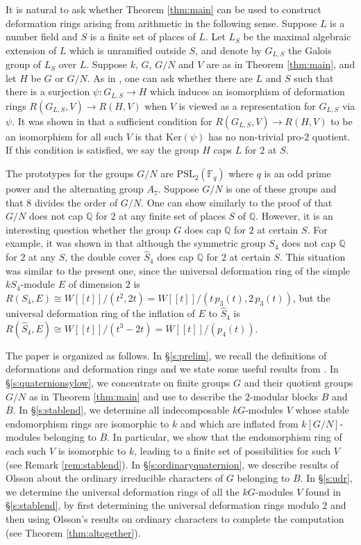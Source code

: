 \documentclass{amsart}
\theoremstyle{plain}
\theoremstyle{definition}
\theoremstyle{remark}
\begin{document}
\medbreak

It is natural  to ask whether Theorem \ref{thm:main} can be used to construct 
deformation rings arising from arithmetic in the following sense.
Suppose $L$ is a number field and $S$ is a finite set of places of $L$. Let $L_S$ be
the maximal algebraic extension of $L$ which is unramified outside $S$, and denote
by $G_{L,S}$ the Galois group of $L_S$ over $L$.  Suppose $k$, $G$, $G/N$ and $V$ are
as in Theorem \ref{thm:main}, and let $H$ be $G$ or $G/N$.
As in \cite{bc5}, one can ask whether there are $L$ and $S$ such 
that there is a surjection $\psi:G_{L,S}\to H$ which induces an isomorphism 
of deformation rings $R(G_{L,S},V)\to R(H, V)$ 
when $V$ is viewed as a representation for $G_{L,S}$ via $\psi$. It was shown in 
\cite[Lemma 3.3]{bc5} that a sufficient condition for $R(G_{L,S},V)\to R(H, V)$ to be an isomorphism 
for all such $V$ is that  $\mathrm{Ker}(\psi)$ has no non-trivial pro-$2$ quotient. If this condition is
satisfied, we say the group $H$ caps $L$ for $2$ at $S$. 

The prototypes for the groups $G/N$ are $\mathrm{PSL}_2(\mathbb{F}_q)$ where $q$ is an
odd prime power and the alternating group $A_7$. Suppose $G/N$ is one of these groups  and that
$8$ divides the order of $G/N$. One can show similarly to the proof of \cite[Thm. 3.7(i)]{bc5}
that $G/N$ does not cap $\mathbb{Q}$ for $2$ at any finite set
of places $S$ of $\mathbb{Q}$. However, it is an interesting question whether the group
$G$ does cap $\mathbb{Q}$ for $2$ at certain $S$. For example, it was shown in
\cite{bcf} that although the symmetric group $S_4$ does not cap $\mathbb{Q}$ for $2$
at any $S$, the double cover $\hat{S}_4$ does cap $\mathbb{Q}$ for $2$ at certain $S$.
This situation was similar to the present one, since the universal deformation ring of 
the simple $kS_4$-module $E$ of dimension $2$ is $R(S_4,E)\cong W[[t]]/(t^2,2t)=
W[[t]]/(t\,p_3(t),2\,p_3(t))$, but the universal deformation ring of the inflation of $E$ to $\hat{S}_4$ 
is $R(\hat{S}_4,E)\cong W[[t]]/(t^3-2t)=W[[t]]/(p_4(t))$.

The paper is organized as follows. In \S\ref{s:prelim}, we recall the definitions of deformations and 
deformation rings and we state some useful results from \cite{3sim,bc}.
In \S\ref{s:quaternionsylow}, we concentrate on 
finite groups $G$ and their quotient groups $G/N$ as in Theorem \ref{thm:main} 
and use  \cite{erd} to describe the $2$-modular blocks $B$ and $\overline{B}$.
In \S\ref{s:stablend}, we determine all indecomposable $kG$-modules $V$ whose stable
endomorphism rings are isomorphic to $k$ and which are inflated from $k[G/N]$-modules belonging to
$\overline{B}$. In particular, we show that the endomorphism ring of each such $V$ is isomorphic to $k$,
leading to a finite set of possibilities for such $V$ (see Remark \ref{rem:stablend}). 
In \S\ref{s:ordinaryquaternion}, we describe results of Olsson \cite{olsson} about the ordinary 
irreducible characters of $G$ belonging to $B$. 
In \S\ref{s:udr}, we determine the universal deformation rings of all the $kG$-modules $V$ found in 
\S\ref{s:stablend}, by first determining the universal deformation rings modulo $2$ and then using 
Olsson's results on ordinary characters to complete the computation
(see Theorem \ref{thm:altogether}).
\end{document}
